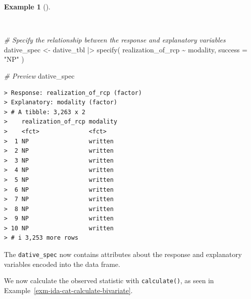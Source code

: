 \documentclass[
  letterpaper,
]{latex/krantz}
\newenvironment{Shaded}{\begin{snugshade}}{\end{snugshade}}
\newcommand{\AttributeTok}[1]{\textcolor[rgb]{0.00,0.00,0.00}{#1}}
\newcommand{\CommentTok}[1]{\textcolor[rgb]{0.00,0.00,0.00}{\textit{#1}}}
\newcommand{\FunctionTok}[1]{\textcolor[rgb]{0.00,0.00,0.00}{#1}}
\newcommand{\NormalTok}[1]{\textcolor[rgb]{0.00,0.00,0.00}{#1}}
\newcommand{\OtherTok}[1]{\textcolor[rgb]{0.00,0.00,0.00}{#1}}
\newcommand{\SpecialCharTok}[1]{\textcolor[rgb]{0.00,0.00,0.00}{#1}}
\newcommand{\StringTok}[1]{\textcolor[rgb]{0.00,0.00,0.00}{#1}}
\theoremstyle{definition}
\newtheorem{example}{Example}[chapter]
\theoremstyle{remark}
\begin{document}
\begin{example}[]\protect\hypertarget{exm-ida-cat-specify-bivariate}{}\label{exm-ida-cat-specify-bivariate}

~

\begin{Shaded}
\begin{Highlighting}[]
\CommentTok{\# Specify the relationship between the response and explanatory variables}
\NormalTok{dative\_spec }\OtherTok{\textless{}{-}}
\NormalTok{  dative\_tbl }\SpecialCharTok{|\textgreater{}}
  \FunctionTok{specify}\NormalTok{(}
\NormalTok{    realization\_of\_rcp }\SpecialCharTok{\textasciitilde{}}\NormalTok{ modality,}
    \AttributeTok{success =} \StringTok{"NP"}
\NormalTok{  )}

\CommentTok{\# Preview}
\NormalTok{dative\_spec}
\end{Highlighting}
\end{Shaded}

\begin{verbatim}
> Response: realization_of_rcp (factor)
> Explanatory: modality (factor)
> # A tibble: 3,263 x 2
>    realization_of_rcp modality
>    <fct>              <fct>   
>  1 NP                 written 
>  2 NP                 written 
>  3 NP                 written 
>  4 NP                 written 
>  5 NP                 written 
>  6 NP                 written 
>  7 NP                 written 
>  8 NP                 written 
>  9 NP                 written 
> 10 NP                 written 
> # i 3,253 more rows
\end{verbatim}

\end{example}

The \texttt{dative\_spec} now contains attributes about the response and
explanatory variables encoded into the data frame.

We now calculate the observed statistic with \texttt{calculate()}, as
seen in Example~\ref{exm-ida-cat-calculate-bivariate}.
\end{document}
